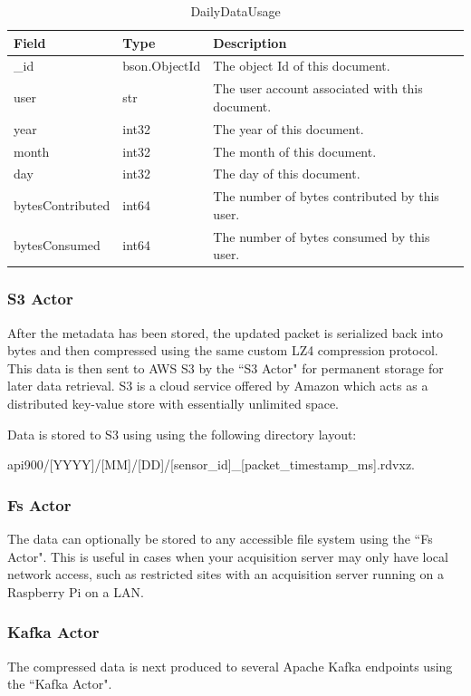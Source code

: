 \begin{table}[H]
	\centering
	\caption{DailyDataUsage}
	\begin{tabularx}{\textwidth}{llX}
		\toprule
		\textbf{Field} & \textbf{Type} & \textbf{Description} \\
		\midrule
		\_id & bson.ObjectId & The object Id of this document. \\
		user & str & The user account associated with this document. \\
		year & int32 & The year of this document. \\
		month & int32 & The month of this document. \\
		day & int32 & The day of this document. \\
		bytesContributed & int64 & The number of bytes contributed by this user. \\
		bytesConsumed & int64 & The number of bytes consumed by this user. \\
		\bottomrule
	\end{tabularx}
	\label{table:DailyDataUsage}
\end{table}

\subsubsection{S3 Actor}
After the metadata has been stored, the updated packet is serialized back into bytes and then compressed using the same custom LZ4  compression protocol. This data is then sent to AWS S3 by the ``S3 Actor" for permanent storage for later data retrieval. S3 is a cloud service offered by Amazon which acts as a distributed key-value store with essentially unlimited space.

Data is stored to S3 using using the following directory layout:

api900/[YYYY]/[MM]/[DD]/[sensor\_id]\_[packet\_timestamp\_ms].rdvxz.

\subsubsection{Fs Actor}
The data can optionally be stored to any accessible file system using the ``Fs Actor". This is useful in cases when your acquisition server may only have local network access, such as restricted sites with an acquisition server running on a Raspberry Pi on a LAN\@.

\subsubsection{Kafka Actor}
The compressed data is next produced to several Apache Kafka endpoints using the ``Kafka Actor".

